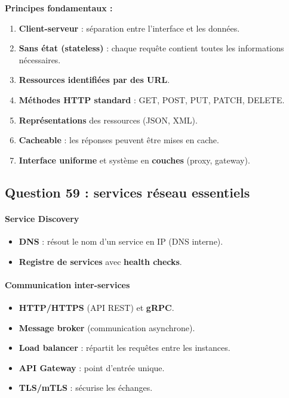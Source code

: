 \documentclass[12pt,a4paper]{article}
\begin{document}
\textbf{Principes fondamentaux :}
\begin{enumerate}
  \item \textbf{Client-serveur} : s\'eparation entre l'interface et les donn\'ees.
  \item \textbf{Sans \'etat (stateless)} : chaque requ\^ete contient toutes les informations n\'ecessaires.
  \item \textbf{Ressources identifi\'ees par des URL}.
  \item \textbf{M\'ethodes HTTP standard} : GET, POST, PUT, PATCH, DELETE.
  \item \textbf{Repr\'esentations} des ressources (JSON, XML).
  \item \textbf{Cacheable} : les r\'eponses peuvent \^etre mises en cache.
  \item \textbf{Interface uniforme} et syst\`eme en \textbf{couches} (proxy, gateway).
\end{enumerate}

\subsection*{Question 59 : services r\'eseau essentiels}

\paragraph{Service Discovery}
\begin{itemize}
  \item \textbf{DNS} : r\'esout le nom d'un service en IP (DNS interne).
  \item \textbf{Registre de services} avec \textbf{health checks}.
\end{itemize}

\paragraph{Communication inter-services}
\begin{itemize}
  \item \textbf{HTTP/HTTPS} (API REST) et \textbf{gRPC}.
  \item \textbf{Message broker} (communication asynchrone).
  \item \textbf{Load balancer} : r\'epartit les requ\^etes entre les instances.
  \item \textbf{API Gateway} : point d'entr\'ee unique.
  \item \textbf{TLS/mTLS} : s\'ecurise les \'echanges.
\end{itemize}
\end{document}

